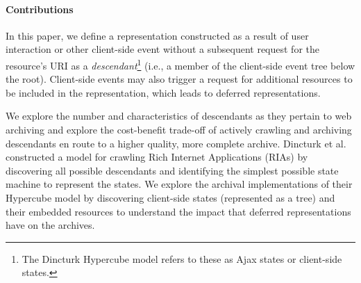 \documentclass{sig-alternate}
\begin{document}

\paragraph{Contributions}
\label{contributions}

In this paper, we define a representation constructed as a result of user interaction or other client-side event without a subsequent request for the resource's URI as a \emph{descendant}\footnote{The Dincturk Hypercube model refers to these as Ajax states or client-side states.} (i.e., a member of the client-side event tree below the root). Client-side events may also trigger a request for additional resources to be included in the representation, which leads to deferred representations.

We explore the number and characteristics of descendants as they pertain to web archiving and explore the cost-benefit trade-off of actively crawling and archiving descendants en route to a higher quality, more complete archive. Dincturk et al. \cite{dincturkAjax} constructed a model for crawling Rich Internet Applications (RIAs) by discovering all possible descendants and identifying the simplest possible state machine to represent the states. We explore the archival implementations of their Hypercube model by discovering client-side states (represented as a tree) and their embedded resources to understand the impact that deferred representations have on the archives. %
\end{document}
